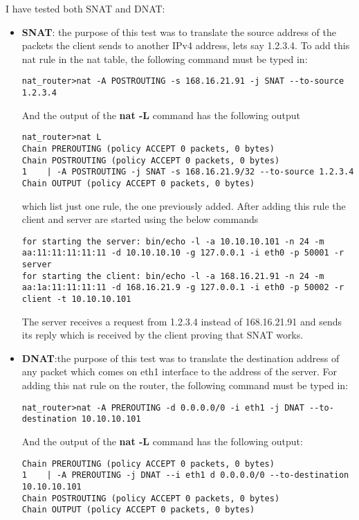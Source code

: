 {{I have tested both SNAT and DNAT:
\begin{itemize}
\item \textbf{SNAT}: the purpose of this test was to translate the source address of the packets the client sends to another IPv4 address, lets say 1.2.3.4.
To add this nat rule in the nat table, the following command must be typed in:
\lstset{language=TeX, caption=Add SNAT rule}
\begin{lstlisting}
nat_router>nat -A POSTROUTING -s 168.16.21.91 -j SNAT --to-source 1.2.3.4
\end{lstlisting}
And the output of the \textbf{nat -L} command has the following output
\lstset{language=TeX, caption=List all rules for standard NAT chains}
\begin{lstlisting}
nat_router>nat L
Chain PREROUTING (policy ACCEPT 0 packets, 0 bytes)
Chain POSTROUTING (policy ACCEPT 0 packets, 0 bytes)
1	 | -A POSTROUTING -j SNAT -s 168.16.21.9/32 --to-source 1.2.3.4
Chain OUTPUT (policy ACCEPT 0 packets, 0 bytes)
\end{lstlisting}

which list just one rule, the one previously added. 
After adding this rule the client and server are started using the below commands
\lstset{language=TeX, caption=SNAT-starting client and server applications}
\begin{lstlisting}
for starting the server: bin/echo -l -a 10.10.10.101 -n 24 -m aa:11:11:11:11:11 -d 10.10.10.10 -g 127.0.0.1 -i eth0 -p 50001 -r server 
for starting the client: bin/echo -l -a 168.16.21.91 -n 24 -m aa:1a:11:11:11:11 -d 168.16.21.9 -g 127.0.0.1 -i eth0 -p 50002 -r client -t 10.10.10.101
\end{lstlisting}
 The server receives a request from 1.2.3.4 instead of 168.16.21.91 and sends its reply which is 
received by the client proving that SNAT works.
\item \label{nat-impl:DNAT} \textbf{DNAT}:the purpose of this test was to translate the destination 
address of any packet which comes on eth1 interface to the address of the server.
For adding this nat rule on the router, the following command must be typed in:
\lstset{language=TeX, caption=Add DNAT rule}
\begin{lstlisting}
nat_router>nat -A PREROUTING -d 0.0.0.0/0 -i eth1 -j DNAT --to-destination 10.10.10.101
\end{lstlisting}
And the output of the \textbf{nat -L} command has the following output:
\lstset{language=TeX, caption=List all rules for standard NAT chains}
\begin{lstlisting}
Chain PREROUTING (policy ACCEPT 0 packets, 0 bytes)
1	 | -A PREROUTING -j DNAT --i eth1 d 0.0.0.0/0 --to-destination 10.10.10.101
Chain POSTROUTING (policy ACCEPT 0 packets, 0 bytes)
Chain OUTPUT (policy ACCEPT 0 packets, 0 bytes)
\end{lstlisting}


\end{itemize}}}
